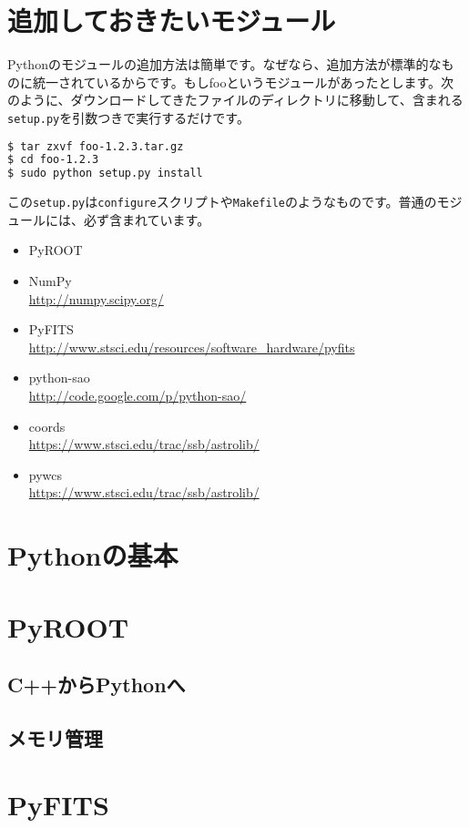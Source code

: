\section{追加しておきたいモジュール}

Pythonのモジュールの追加方法は簡単です。なぜなら、追加方法が標準的なものに統一されているからです。もしfooというモジュールがあったとします。次のように、ダウンロードしてきたファイルのディレクトリに移動して、含まれる\texttt{setup.py}を引数つきで実行するだけです。
\begin{lstlisting}[language=bash]
$ tar zxvf foo-1.2.3.tar.gz
$ cd foo-1.2.3
$ sudo python setup.py install
\end{lstlisting}
この\texttt{setup.py}は\texttt{configure}スクリプトや\texttt{Makefile}のようなものです。普通のモジュールには、必ず含まれています。

\begin{itemize}
  \item PyROOT
  \item NumPy\\\url{http://numpy.scipy.org/}
  \item PyFITS\\\url{http://www.stsci.edu/resources/software_hardware/pyfits}
  \item python-sao\\\url{http://code.google.com/p/python-sao/}
  \item coords\\\url{https://www.stsci.edu/trac/ssb/astrolib/}
  \item pywcs\\\url{https://www.stsci.edu/trac/ssb/astrolib/}
\end{itemize}

\section{Pythonの基本}

\section{PyROOT}

\subsection{C++からPythonへ}

\subsection{メモリ管理}

\section{PyFITS}